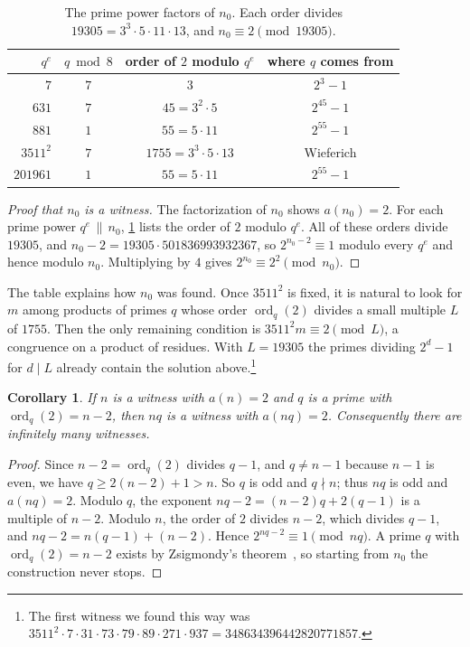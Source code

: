 \documentclass[11pt]{amsart}
\newtheorem{corollary}[theorem]{Corollary}
\theoremstyle{remark}
\newcommand{\nO}{n_0}
\begin{document}
\begin{table}[t]
\centering
\caption{The prime power factors of $\nO$. Each order divides
$19305=3^{3}\cdot5\cdot11\cdot13$, and $\nO\equiv 2\pmod{19305}$.}
\label{tab:n0}
\begin{tabular}{@{}rccc@{}}
\toprule
$q^{e}$ & $q \bmod 8$ & order of $2$ modulo $q^{e}$ & where $q$ comes from\\
\midrule
$7$ & $7$ & $3$ & $2^{3}-1$\\
$631$ & $7$ & $45=3^{2}\cdot5$ & $2^{45}-1$\\
$881$ & $1$ & $55=5\cdot11$ & $2^{55}-1$\\
$3511^{2}$ & $7$ & $1755=3^{3}\cdot5\cdot13$ & Wieferich\\
$201961$ & $1$ & $55=5\cdot11$ & $2^{55}-1$\\
\bottomrule
\end{tabular}
\end{table}

\begin{proof}[Proof that $\nO$ is a witness]
The factorization of $\nO$ shows $a(\nO)=2$. For each prime power $q^{e}\,\|\,\nO$,
\cref{tab:n0} lists the order of $2$ modulo $q^{e}$. All of these orders divide $19305$, and
$\nO-2=19305\cdot 501836993932367$, so $2^{\nO-2}\equiv1$ modulo every $q^{e}$ and hence
modulo $\nO$. Multiplying by $4$ gives $2^{\nO}\equiv 2^{2}\pmod{\nO}$.
\end{proof}

The table explains how $\nO$ was found. Once $3511^{2}$ is fixed, it is natural to look for
$m$ among products of primes $q$ whose order $\operatorname{ord}_q(2)$ divides a small multiple
$L$ of $1755$. Then the only remaining condition is $3511^{2}m\equiv2\pmod L$, a congruence
on a product of residues. With $L=19305$ the primes dividing $2^{d}-1$ for $d\mid L$ already
contain the solution above.\footnote{The first witness we found this way was
$3511^{2}\cdot7\cdot31\cdot73\cdot79\cdot89\cdot271\cdot937=348634396442820771857$.}

\begin{corollary}\label{cor:infinite}
If $n$ is a witness with $a(n)=2$ and $q$ is a prime with $\operatorname{ord}_q(2)=n-2$, then
$nq$ is a witness with $a(nq)=2$. Consequently there are infinitely many witnesses.
\end{corollary}

\begin{proof}
Since $n-2=\operatorname{ord}_q(2)$ divides $q-1$, and $q\ne n-1$ because $n-1$ is even, we
have $q\ge 2(n-2)+1>n$. So $q$ is odd and $q\nmid n$; thus $nq$ is odd and $a(nq)=2$. Modulo $q$, the exponent $nq-2=(n-2)q+2(q-1)$ is a
multiple of $n-2$. Modulo $n$, the order of $2$ divides $n-2$, which divides $q-1$, and
$nq-2=n(q-1)+(n-2)$. Hence $2^{nq-2}\equiv1\pmod{nq}$. A prime $q$ with
$\operatorname{ord}_q(2)=n-2$ exists by Zsigmondy's theorem~\cite{zsigmondy}, so starting
from $\nO$ the construction never stops.
\end{proof}
\end{document}
